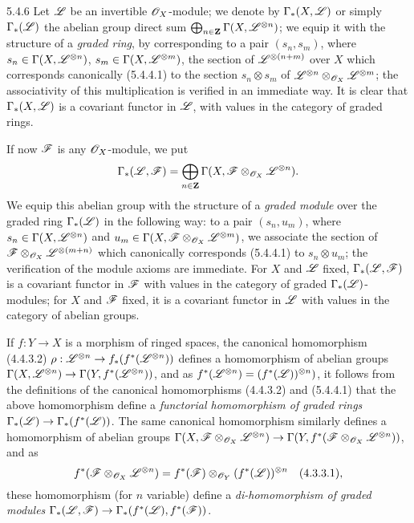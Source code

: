 \begin{env}{5.4.6}
\label{env-0.5.4.6}
Let $\mathscr{L}$ be an invertible $\mathscr{O}_X$-module; we denote by $\Gamma_*(X,\mathscr{L})$ or simply
$\Gamma_*(\mathscr{L})$ the abelian group direct sum
$\bigoplus_{n\in\mathbf{Z}}\Gamma(X,\mathscr{L}^{\otimes n})$; we equip it with the structure of a
\emph{graded ring}, by corresponding to a pair $(s_n,s_m)$, where
$s_n\in\Gamma(X,\mathscr{L}^{\otimes n})$, $s_m\in\Gamma(X,\mathscr{L}^{\otimes m})$, the section of
$\mathscr{L}^{\otimes(n+m)}$ over $X$ which corresponds canonically (5.4.4.1) to the section
$s_n\otimes s_m$ of $\mathscr{L}^{\otimes n}\otimes_{\mathscr{O}_X}\mathscr{L}^{\otimes m}$; the associativity
of this multiplication is verified in an immediate way. It is clear that $\Gamma_*(X,\mathscr{L})$
is a covariant functor in $\mathscr{L}$, with values in the category of graded rings.

If now $\mathscr{F}$ is any $\mathscr{O}_X$-module, we put
\[
  \Gamma_*(\mathscr{L},\mathscr{F})
  =\bigoplus_{n\in\mathbf{Z}}\Gamma(X,\mathscr{F}\otimes_{\mathscr{O}_X}\mathscr{L}^{\otimes n}).
\]
We equip this abelian group with the structure of a \emph{graded module} over the graded
ring $\Gamma_*(\mathscr{L})$ in the following way: to a pair $(s_n,u_m)$, where
$s_n\in\Gamma(X,\mathscr{L}^{\otimes n})$ and
$u_m\in\Gamma(X,\mathscr{F}\otimes_{\mathscr{O}_X}\mathscr{L}^{\otimes m})$, we associate the section of
$\mathscr{F}\otimes_{\mathscr{O}_X}\mathscr{L}^{\otimes(m+n)}$ which canonically corresponds (5.4.4.1) to
$s_n\otimes u_m$; the verification of the module axioms are immediate. For $X$ and $\mathscr{L}$
fixed, $\Gamma_*(\mathscr{L},\mathscr{F})$ is a covariant functor in $\mathscr{F}$ with values in the
category of graded $\Gamma_*(\mathscr{L})$-modules; for $X$ and $\mathscr{F}$ fixed, it is a covariant
functor in $\mathscr{L}$ with values in the category of abelian groups.

If $f:Y\to X$ is a morphism of ringed spaces, the canonical homomorphism (4.4.3.2)
$\rho:\mathscr{L}^{\otimes n}\to f_*(f^*(\mathscr{L}^{\otimes n}))$ defines a homomorphism of
abelian groups $\Gamma(X,\mathscr{L}^{\otimes n})\to\Gamma(Y,f^*(\mathscr{L}^{\otimes n}))$, and as
$f^*(\mathscr{L}^{\otimes n})=(f^*(\mathscr{L}))^{\otimes n})$, it follows from the definitions of the
canonical homomorphisms (4.4.3.2) and (5.4.4.1) that the above homomorphism define a
\emph{functorial homomorphism of graded rings $\Gamma_*(\mathscr{L})\to\Gamma_*(f^*(\mathscr{L}))$}.
The same canonical homomorphism  similarly defines a homomorphism of abelian
groups
$\Gamma(X,\mathscr{F}\otimes_{\mathscr{O}_X}\mathscr{L}^{\otimes n})
\to\Gamma(Y,f^*(\mathscr{F}\otimes_{\mathscr{O}_X}\mathscr{L}^{\otimes n}))$, and as
\[
  f^*(\mathscr{F}\otimes_{\mathscr{O}_X}\mathscr{L}^{\otimes n})
  =f^*(\mathscr{F})\otimes_{\mathscr{O}_Y}(f^*(\mathscr{L}))^{\otimes n}
  \quad(4.3.3.1),
\]
these homomorphism (for $n$ variable) define a \emph{di-homomorphism of graded modules
$\Gamma_*(\mathscr{L},\mathscr{F})\to\Gamma_*(f^*(\mathscr{L}),f^*(\mathscr{F}))$}.
\end{env}

